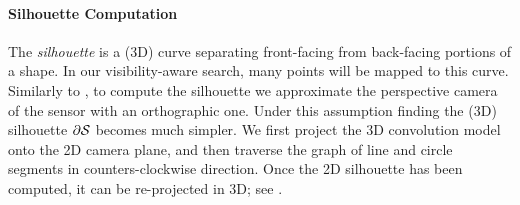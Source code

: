 
\paragraph{Silhouette Computation}
The \emph{silhouette} is a (3D) curve separating front-facing from back-facing portions of a shape. In our visibility-aware search, many points will be mapped to this curve. Similarly to \cite{tagliasacchi2015robust}, to compute the silhouette we approximate the perspective camera of the sensor with an orthographic one. Under this assumption finding the (3D) silhouette $\partial \mathcal{S}$ becomes much simpler. We first project the 3D convolution model onto the 2D camera plane, and then traverse the graph of line and circle segments in counters-clockwise direction.  Once the 2D silhouette has been computed, it can be re-projected in 3D; see .


\FINISH
